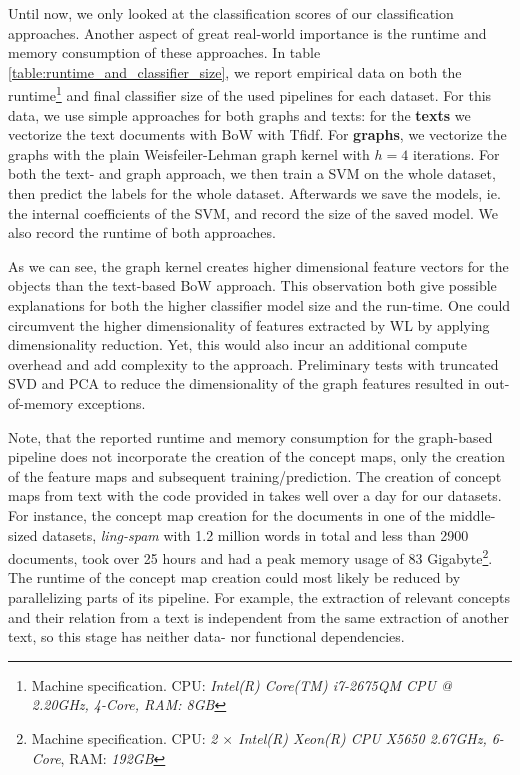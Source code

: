 Until now, we only looked at the classification scores of our classification approaches.
Another aspect of great real-world importance is the runtime and memory consumption of these approaches.
In table \ref{table:runtime_and_classifier_size}, we report empirical data on both the runtime\footnote{Machine specification. CPU: \textit{Intel(R) Core(TM) i7-2675QM CPU @ 2.20GHz, 4-Core, RAM: \textit{8GB}}} and final classifier size of the used pipelines for each dataset.
For this data, we use simple approaches for both graphs and texts: for the \textbf{texts} we vectorize the text documents with BoW with Tfidf.
For \textbf{graphs}, we vectorize the graphs with the plain Weisfeiler-Lehman graph kernel with $h = 4$ iterations.
For both the text- and graph approach, we then train a SVM on the whole dataset, then predict the labels for the whole dataset. Afterwards we save the models, ie. the internal coefficients of the SVM, and record the size of the saved model.
We also record the runtime of both approaches.

As we can see, the graph kernel creates higher dimensional feature vectors for the objects than the text-based BoW approach. 
This observation both give possible explanations for both the higher classifier model size and the run-time.
One could circumvent the higher dimensionality of features extracted by WL by applying dimensionality reduction.
Yet, this would also incur an additional compute overhead and add complexity to the approach.
Preliminary tests with truncated SVD \cite{Mathematics2009} and PCA \cite{Jolliffe2002} to reduce the dimensionality of the graph features resulted in out-of-memory exceptions.

Note, that the reported runtime and memory consumption for the graph-based pipeline does not incorporate the creation of the concept maps, only the creation of the feature maps and subsequent training/prediction.
The creation of concept maps from text with the code provided in \cite{Falke2017b} takes well over a day for our datasets.
For instance, the concept map creation for the documents  in one of the middle-sized datasets, \textit{ling-spam} with 1.2 million words in total and less than 2900 documents, took over 25 hours and had a peak memory usage of 83 Gigabyte\footnote{Machine specification. CPU: \textit{2 $\times$ Intel(R) Xeon(R) CPU X5650 \@ 2.67GHz, 6-Core}, RAM: \textit{192GB}}.
The runtime of the concept map creation could most likely be reduced by parallelizing parts of its pipeline.
For example, the extraction of relevant concepts and their relation from a text is independent from the same extraction of another text, so this stage has neither data- nor functional dependencies.

